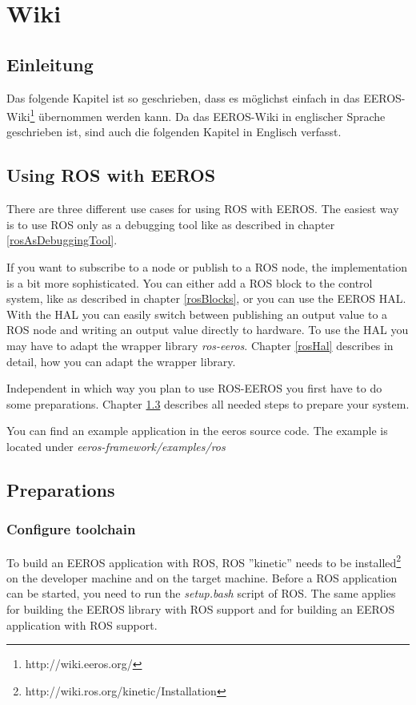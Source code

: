 \chapter{Wiki}
\label{chapter:wiki}
\section{Einleitung}
Das folgende Kapitel ist so geschrieben, dass es möglichst einfach in das EEROS-Wiki\footnote{http://wiki.eeros.org/} übernommen werden kann.
Da das EEROS-Wiki in englischer Sprache geschrieben ist, sind auch die folgenden Kapitel in Englisch verfasst.


\section{Using ROS with EEROS}	%
There are three different use cases for using ROS with EEROS.
The easiest way is to use ROS only as a debugging tool like as described in chapter \ref{rosAsDebuggingTool}.

If you want to subscribe to a node or publish to a ROS node, the implementation is a bit more sophisticated.
You can either add a ROS block to the control system, like as described in chapter \ref{rosBlocks}, or you can use the EEROS HAL.
With the HAL you can easily switch between publishing an output value to a ROS node and writing an output value directly to hardware.
To use the HAL you may have to adapt the wrapper library \textit{ros-eeros}.
Chapter \ref{rosHal} describes in detail, how you can adapt the wrapper library.

Independent in which way you plan to use ROS-EEROS you first have to do some preparations.
Chapter \ref{preparations} describes all needed steps to prepare your system.

You can find an example application in the eeros source code.
The example is located under \textit{eeros-framework/examples/ros}


\section{Preparations}
\label{preparations}
\subsection{Configure toolchain}
\label{configureToolchain}
To build an EEROS application with ROS, ROS ''kinetic'' needs to be installed\footnote{http://wiki.ros.org/kinetic/Installation} on the developer machine and on the target machine.
Before a ROS application can be started, you need to run the \textit{setup.bash} script of ROS.
The same applies for building the EEROS library with ROS support and for building an EEROS application with ROS support.

